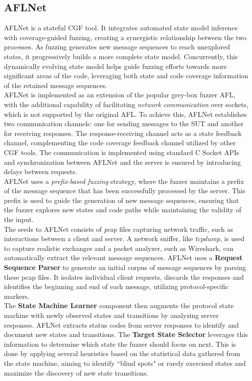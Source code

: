 \subsection{AFLNet}
AFLNet \cite{AFLNet} is a stateful CGF tool. It integrates automated state model inference with coverage-guided fuzzing, creating a synergistic relationship between the two processes. As fuzzing generates new message sequences to reach unexplored states, it progressively builds a more complete state model. Concurrently, this dynamically evolving state model helps guide fuzzing efforts towards more significant areas of the code, leveraging both state and code coverage information of the retained message sequences.
\\AFLNet is implemented as an extension of the popular grey-box fuzzer AFL, with the additional capability of facilitating \textit{network communication} over sockets, which is not supported by the original AFL. To achieve this, AFLNet establishes two communication channels: one for sending messages to the SUT and another for receiving responses. The response-receiving channel acts as a state feedback channel, complementing the code coverage feedback channel utilized by other CGF tools. The communication is implemented using standard C Socket APIs and synchronization between AFLNet and the server is ensured by introducing delays between requests.
\\AFLNet uses a \textit{prefix-based fuzzing} strategy, where the fuzzer maintains a prefix of the message sequence that has been successfully processed by the server. This prefix is used to guide the generation of new message sequences, ensuring that the fuzzer explores new states and code paths while maintaining the validity of the input.
\\The seeds to AFLNet consists of \textit{pcap} files capturing network traffic, such as interactions between a client and server. A network sniffer, like \textit{tcpdump}, is used to capture realistic exchanges and a packet analyzer, such as Wireshark, can automatically extract the relevant message sequences. AFLNet uses a \textbf{Request Sequence Parser} to generate an initial corpus of message sequences by parsing these pcap files. It isolates individual client requests, discards the responses and identifies the beginning and end of each message, utilizing protocol-specific markers.
\\The \textbf{State Machine Learner} component then augments the protocol state machine with newly observed states and transitions by analyzing server responses. AFLNet extracts status codes from server responses to identify and document new states and transitions. The \textbf{Target State Selector} leverages this information to determine which state the fuzzer should focus on next. This is done by applying several heuristics based on the statistical data gathered from the state machine, aiming to identify ``blind spots" or rarely exercised states and maximize the discovery of new state transitions.

